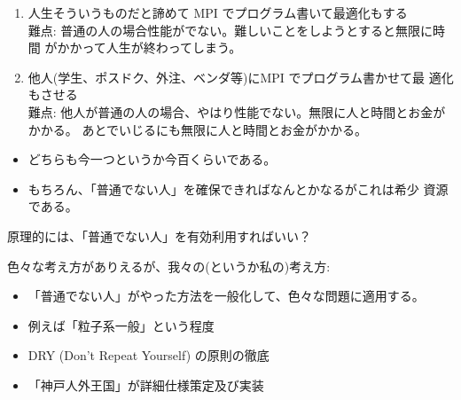 \documentclass[12pt,dvipdfmx]{article}
\begin{document}

\begin{enumerate}

\item 人生そういうものだと諦めて MPI でプログラム書いて最適化もする\\
難点: 普通の人の場合性能がでない。難しいことをしようとすると無限に時間
がかかって人生が終わってしまう。


\item 他人(学生、ポスドク、外注、ベンダ等)にMPI でプログラム書かせて最
適化もさせる\\
難点: 他人が普通の人の場合、やはり性能でない。無限に人と時間とお金がかかる。
あとでいじるにも無限に人と時間とお金がかかる。

\end{enumerate}

\begin{itemize}
\item どちらも今一つというか今百くらいである。

\item もちろん、「普通でない人」を確保できればなんとかなるがこれは希少
資源である。

\end{itemize}


\begin{shadebox}
原理的には、「普通でない人」を有効利用すればいい？
\end{shadebox}










色々な考え方がありえるが、我々の(というか私の)考え方:

\begin{itemize}

\item 「普通でない人」がやった方法を一般化して、色々な問題に適用する。
\item 例えば「粒子系一般」という程度
\item DRY (Don't Repeat Yourself) の原則の徹底
\item 「神戸人外王国」が詳細仕様策定及び実装

\end{itemize}
\end{document}

